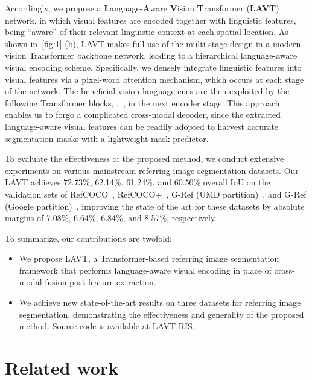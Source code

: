 \documentclass[10pt,twocolumn,letterpaper]{article}
\begin{document}
Accordingly, we propose a \textbf{L}anguage-\textbf{A}ware \textbf{V}ision \textbf{T}ransformer (\textbf{LAVT}) network, in which visual features are encoded together with linguistic features, being ``aware'' of their relevant linguistic context at each spatial location.
As shown in~\cref{fig:1} (b), LAVT makes full use of the multi-stage design in a modern vision Transformer backbone network, leading to a hierarchical language-aware visual encoding scheme.
Specifically, we densely integrate linguistic features into visual features via a pixel-word attention mechanism, which occurs at each stage of the network.
The beneficial vision-language cues are then exploited by the following Transformer blocks, \eg,~\cite{Liu_2021_swin}, in the next encoder stage.
This approach enables us to forgo a complicated cross-modal decoder, since the extracted language-aware visual features can be readily adopted to harvest accurate segmentation masks with a lightweight mask predictor.

To evaluate the effectiveness of the proposed method, we conduct extensive experiments on various mainstream referring image segmentation datasets.
Our LAVT achieves 72.73\%, 62.14\%, 61.24\%, and 60.50\% overall IoU on the validation sets of RefCOCO~\cite{yu2016modeling}, RefCOCO+~\cite{yu2016modeling}, G-Ref (UMD partition)~\cite{nagaraja16refexp}, and G-Ref (Google partition)~\cite{mao2015generation}, improving the state of the art for these datasets by absolute margins of 7.08\%, 6.64\%, 6.84\%, and 8.57\%, respectively.

To summarize, our contributions are twofold: 
\begin{itemize}
\item We propose LAVT, a Transformer-based referring image segmentation framework that performs language-aware visual encoding in place of cross-modal fusion post feature extraction.
\item We achieve new state-of-the-art results on three datasets for referring image segmentation, demonstrating the effectiveness and generality of the proposed method. Source code is available at \href{https://github.com/yz93/LAVT-RIS}{LAVT-RIS}.
\end{itemize}
 \section{Related work}
\label{sec:related}
\end{document}
